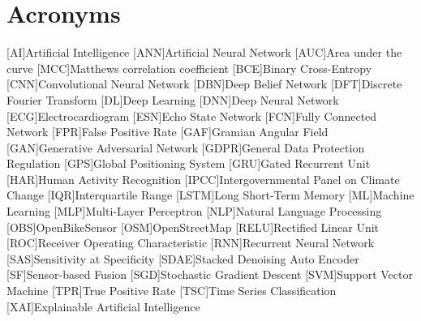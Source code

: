 
\cleardoublepage
\chapter{Acronyms}

\acresetall

\begin{acronym}[Bash]
	[AI]{Artificial Intelligence}
	[ANN]{Artificial Neural Network}
	[AUC]{Area under the curve}
	[MCC]{Matthews correlation coefficient}
	[BCE]{Binary Cross-Entropy}
	[CNN]{Convolutional Neural Network}
	[DBN]{Deep Belief Network}
	[DFT]{Discrete Fourier Transform}
	[DL]{Deep Learning}
	[DNN]{Deep Neural Network}
	[ECG]{Electrocardiogram}
	[ESN]{Echo State Network}
	[FCN]{Fully Connected Network}
	[FPR]{False Positive Rate}
	[GAF]{Gramian Angular Field}
	[GAN]{Generative Adversarial Network}
	[GDPR]{General Data Protection Regulation}
	[GPS]{Global Positioning System}
	[GRU]{Gated Recurrent Unit}
	[HAR]{Human Activity Recognition}
	[IPCC]{Intergovernmental Panel on Climate Change}
	[IQR]{Interquartile Range}
	[LSTM]{Long Short-Term Memory}	
	[ML]{Machine Learning}
	[MLP]{Multi-Layer Perceptron}
	[NLP]{Natural Language Processing}
	[OBS]{OpenBikeSensor}
	[OSM]{OpenStreetMap}
	[RELU]{Rectified Linear Unit}
	[ROC]{Receiver Operating Characteristic}
	[RNN]{Recurrent Neural Network}
	[SAS]{Sensitivity at Specificity}
	[SDAE]{Stacked Denoising Auto Encoder}
	[SF]{Sensor-based Fusion}
	[SGD]{Stochastic Gradient Descent}
	[SVM]{Support Vector Machine}
	[TPR]{True Positive Rate}
	[TSC]{Time Series Classification}
	[XAI]{Explainable Artificial Intelligence}
\end{acronym}

\acresetall